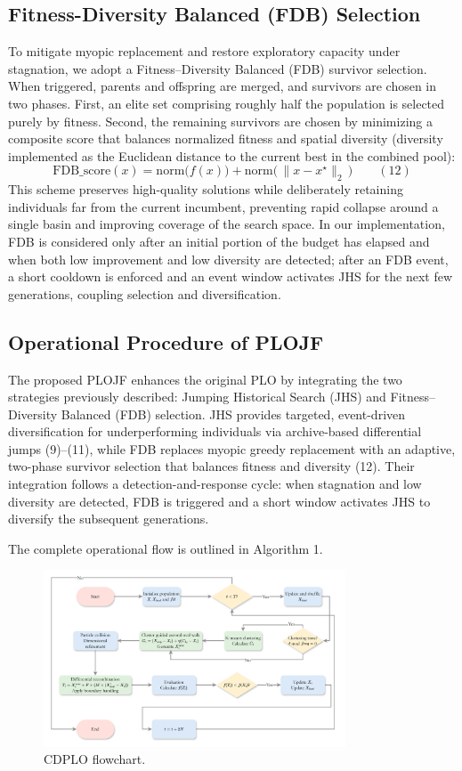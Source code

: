 \documentclass[3p]{elsarticle}
\begin{document}
\subsection{Fitness-Diversity Balanced (FDB) Selection}
To mitigate myopic replacement and restore exploratory capacity under stagnation, we adopt a Fitness–Diversity Balanced (FDB) survivor selection. When triggered, parents and offspring are merged, and survivors are chosen in two phases. First, an elite set comprising roughly half the population is selected purely by fitness. Second, the remaining survivors are chosen by minimizing a composite score that balances normalized fitness and spatial diversity (diversity implemented as the Euclidean distance to the current best in the combined pool):
\[ \mathrm{FDB\_score}(x) = \mathrm{norm}\bigl(f(x)\bigr) + \mathrm{norm}\bigl(\,\|x - x^{\star}\|_2\,\bigr) \qquad(12) \]
This scheme preserves high-quality solutions while deliberately retaining individuals far from the current incumbent, preventing rapid collapse around a single basin and improving coverage of the search space. In our implementation, FDB is considered only after an initial portion of the budget has elapsed and when both low improvement and low diversity are detected; after an FDB event, a short cooldown is enforced and an event window activates JHS for the next few generations, coupling selection and diversification.

\subsection{Operational Procedure of PLOJF}
The proposed PLOJF enhances the original PLO by integrating the two strategies previously described: Jumping Historical Search (JHS) and Fitness–Diversity Balanced (FDB) selection. JHS provides targeted, event-driven diversification for underperforming individuals via archive-based differential jumps (9)–(11), while FDB replaces myopic greedy replacement with an adaptive, two-phase survivor selection that balances fitness and diversity (12). Their integration follows a detection-and-response cycle: when stagnation and low diversity are detected, FDB is triggered and a short window activates JHS to diversify the subsequent generations.

The complete operational flow is outlined in Algorithm 1.

\begin{figure}[h]
\centering
\includegraphics[width=0.8\textwidth]{CDPLO-flowchart}
\caption{CDPLO flowchart.}
\label{fig:flowchart}
\end{figure}
\end{document}
